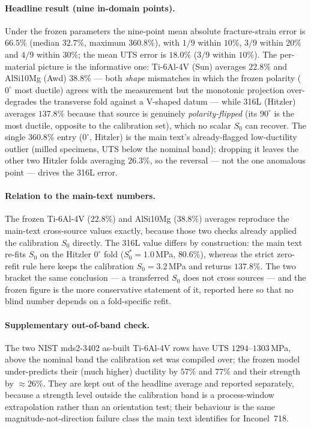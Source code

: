 \documentclass[11pt,a4paper,twocolumn]{article}
\begin{document}
\paragraph{Headline result (nine in-domain points).}
Under the frozen parameters the nine-point mean absolute fracture-strain error is $66.5\%$ (median
$32.7\%$, maximum $360.8\%$), with $1/9$ within $10\%$, $3/9$ within $20\%$ and $4/9$ within $30\%$; the
mean UTS error is $18.0\%$ ($3/9$ within $10\%$). The per-material picture is the informative one:
Ti-6Al-4V (Sun) averages $22.8\%$ and AlSi10Mg (Awd) $38.8\%$ --- both \emph{shape} mismatches in which
the frozen polarity ($0^\circ$ most ductile) agrees with the measurement but the monotonic projection
over-degrades the transverse fold against a V-shaped datum --- while 316L (Hitzler) averages $137.8\%$
because that source is genuinely \emph{polarity-flipped} (its $90^\circ$ is the most ductile, opposite to
the calibration set), which no scalar $S_0$ can recover. The single $360.8\%$ entry ($0^\circ$, Hitzler) is
the main text's already-flagged low-ductility outlier (milled specimens, UTS below the nominal band);
dropping it leaves the other two Hitzler folds averaging $26.3\%$, so the reversal --- not the one anomalous
point --- drives the 316L error.

\paragraph{Relation to the main-text numbers.}
The frozen Ti-6Al-4V ($22.8\%$) and AlSi10Mg ($38.8\%$) averages reproduce the main-text cross-source
values exactly, because those two checks already applied the calibration $S_0$ directly. The 316L value
differs by construction: the main text re-fits $S_0$ on the Hitzler $0^\circ$ fold ($S_0^* = 1.0$\,MPa,
$80.6\%$), whereas the strict zero-refit rule here keeps the calibration $S_0 = 3.2$\,MPa and returns
$137.8\%$. The two bracket the same conclusion --- a transferred $S_0$ does not cross sources --- and the
frozen figure is the more conservative statement of it, reported here so that no blind number depends on
a fold-specific refit.

\paragraph{Supplementary out-of-band check.}
The two NIST mds2-3402 as-built Ti-6Al-4V rows have UTS $1294$--$1303$\,MPa, above the nominal band the
calibration set was compiled over; the frozen model under-predicts their (much higher) ductility by
$57\%$ and $77\%$ and their strength by $\approx 26\%$. They are kept out of the headline average and
reported separately, because a strength level outside the calibration band is a process-window
extrapolation rather than an orientation test; their behaviour is the same magnitude-not-direction failure
class the main text identifies for Inconel~718.
\end{document}
